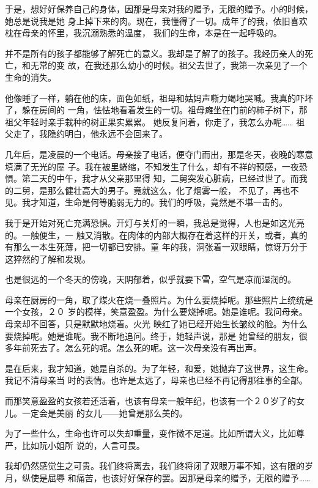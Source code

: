 \documentclass[12pt,a4paper]{article}
\begin{document}
		于是，想好好保养自己的身体，因那是母亲对我的赠予，无限的赠予。小的时候，她总是说我是她
	身上掉下来的肉。现在，我懂得了一切。成年了的我，依旧喜欢枕在母亲的怀里，我沉溺熟悉的温度，
	我们的生命，本是在一起呼吸的。

		并不是所有的孩子都能够了解死亡的意义。我却是了解了的孩子。我经历亲人的死亡，和无常的变
	故，在我还那么幼小的时候。祖父去世了，我第一次亲见了一个生命的消失。

		他像睡了一样，躺在他的床，面色如纸，祖母和姑妈声嘶力竭地哭喊。我真的吓坏了，躲在房间的
	一角，怯怯地看着发生的一切。祖母瘫坐在门前的柿子树下，那祖父年轻时亲手栽种的树正果实累累。
	她反复问着，你走了，我怎么办呢…… 祖父走了，我隐约明白，他永远不会回来了。

		几年后，是凌晨的一个电话。母亲接了电话，便夺门而出，那是冬天，夜晚的寒意填满了无光的屋
	子。我在被里蜷缩，不知发生了什么，却有不祥的预感，一夜恐惧。第二天的中午，我才从父亲那里得
	知，二舅突发心脏病，已经过世了。而我的二舅，是那么健壮高大的男子。竟就这么，化了烟雾一般，
	不见了，再也不见。我才知道，生命是何等脆弱无力的。我们的呼吸，竟然是不堪一击的。

		我于是开始对死亡充满恐惧。开灯与关灯的一瞬，我总是觉得，人也是如这光亮的。一触便生，一
	触又消散。在肉体的内部大概存在着这样的开关，或者，真的有那么一本生死薄，把一切都已安排。童
	年的我，洞张着一双眼睛，惊讶万分于这猝然的了解和发现。

		也是很远的一个冬天的傍晚，天阴郁着，似乎就要下雪，空气是凉而湿润的。

		母亲在厨房的一角，取了煤火在烧一叠照片。为什么要烧掉呢。那些照片上统统是一个女孩，２０
	岁的模样，笑意盈盈。为什么要烧掉呢。她是谁呢。我问母亲。母亲却不回答，只是默默地烧着。火光
	映红了她已经开始生长皱纹的脸。为什么要烧掉呢。她是谁呢。我不断地追问。终于，她轻声说，那是
	她曾经的朋友，很多年前死去了。怎么死的呢。怎么死的呢。这一次母亲没有再出声。

		是在后来，我才知道，她是自杀的。为了年轻，和爱，她抛弃了这世界，这生命。我记不清母亲当
	时的表情。也许是太远了，母亲也已经不再记得那往事的全部。

		而那笑意盈盈的女孩若还活着，也该有母亲一般年纪，也该有一个２０岁了的女儿。一定会是美丽
	的女儿——她曾是那么美的。

		为了一些什么，生命也许可以失却重量，变作微不足道。比如所谓大义，比如尊严，比如阮小姐所
	说的，人言可畏。

		我却仍然感觉生之可贵。我们终将离去，我们终将闭了双眼万事不知，这有限的岁月，纵使是屈辱
	和痛苦，也该好好保存的罢。因那是母亲的赠予，无限的赠予……
\end{document}
